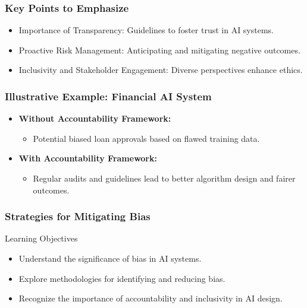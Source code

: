 \documentclass[aspectratio=169]{beamer}
\begin{document}
\begin{frame}[fragile]
    \frametitle{Key Points to Emphasize}
    \begin{itemize}
        \item Importance of Transparency: Guidelines to foster trust in AI systems.
        \item Proactive Risk Management: Anticipating and mitigating negative outcomes.
        \item Inclusivity and Stakeholder Engagement: Diverse perspectives enhance ethics.
    \end{itemize}
\end{frame}

\begin{frame}[fragile]
    \frametitle{Illustrative Example: Financial AI System}
    \begin{itemize}
        \item \textbf{Without Accountability Framework:}
            \begin{itemize}
                \item Potential biased loan approvals based on flawed training data.
            \end{itemize}
        \item \textbf{With Accountability Framework:}
            \begin{itemize}
                \item Regular audits and guidelines lead to better algorithm design and fairer outcomes.
            \end{itemize}
    \end{itemize}
\end{frame}

\begin{frame}[fragile]
    \frametitle{Strategies for Mitigating Bias}
    \begin{block}{Learning Objectives}
        \begin{itemize}
            \item Understand the significance of bias in AI systems.
            \item Explore methodologies for identifying and reducing bias.
            \item Recognize the importance of accountability and inclusivity in AI design.
        \end{itemize}
    \end{block}
\end{frame}
\end{document}
